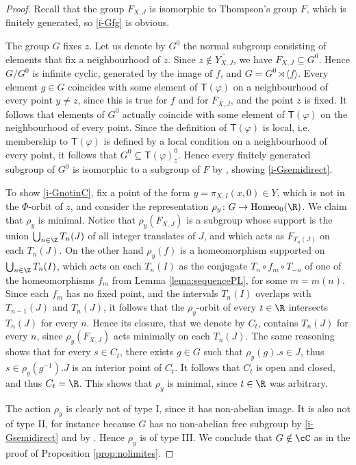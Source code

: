 \documentclass[reqno]{amsart}
\newcommand{\Tphi}{\mathsf{T}(\varphi)}
\begin{document}
\begin{proof}
Recall that the group $F_{X, J}$ is isomorphic to Thompson's group $F$, which is finitely generated, so \eqref{i-Gfg} is obvious. 

The group $G$ fixes $z$.  Let us denote by $G^0$ the normal subgroup consisting of elements that fix a neighbourhood of $z$.
Since $z\notin \overline{Y_{X,J}}$, we have $F_{X, J}\subseteq G^0$. Hence $G/G^0$ is infinite cyclic, generated by the image of $f$, and $G=G^0\rtimes \langle f\rangle$. Every element $g\in G$ coincides with some element of $\Tphi$ on a neighbourhood of every point $y\neq z$, since this  is true for $f$ and for  $F_{X, J}$, and the point $z$ is fixed. It follows that elements of $G^0$ actually coincide with some element of $\Tphi$ on the neighbourhood of every point. Since the definition of $\Tphi$ is local, i.e. membership to $\Tphi$ is defined by a local condition on a neighbourhood of every point,  it follows that $G^0\subseteq \Tphi^0_z$. Hence every finitely generated subgroup of $G^0$ is isomorphic to a subgroup of $F$ by \cite[Lemma 7.2]{MatteBonTriestino2020}, showing \eqref{i-Gsemidirect}.

To show \eqref{i-GnotinC}, fix a point of the form $y=\pi_{X, I}(x, 0)\in Y$, which is not in the $\Phi$-orbit of $z$, and consider the representation $\rho_y\colon G\to \mathrm{Homeo}_0(\R)$. We claim that $\rho_y$ is minimal. Notice that $\rho_y(F_{X, J})$ is a subgroup whose support is the union $\bigcup_{n\in \Z} T_n(J)$ of all integer translates of $J$, and which acts as $F_{T_n(J)}$ on each $T_n(J)$. On the other hand $\rho_y(f)$ is a homeomorphism supported on $\bigcup_{n\in \Z} T_n(I)$, which acts on each $T_n(I)$ as the conjugate $T_n \circ f_m \circ T_{-n}$ of one of the homeomorphisms $f_m$ from Lemma \ref{lema:sequencePL}, for some $m=m(n)$. Since each $f_m$ has no fixed point, and the intervals $T_n(I)$ overlaps with $T_{n-1}(J)$ and $T_n(J)$, it follows that the $\rho_y$-orbit of every $t\in \R$ intersects $T_n(J)$ for every $n$. Hence its closure, that we denote by $C_t$, contains $T_n(J)$ for every $n$, since $\rho_y(F_{X, J})$ acts minimally on each $T_n(J)$. The same reasoning shows that for every $s\in C_t$, there exists $g\in G$ such that $\rho_y(g).s\in J$, thus $s\in \rho_y(g^{-1}).J$ is an interior point of $C_t$. It follows that $C_t$ is open and closed, and thus $C_t=\R$.  This shows that $\rho_y$ is minimal, since $t\in \R$ was arbitrary.

The action $\rho_y$ is clearly not of type I, since it has non-abelian image. It is also not of type II, for instance because $G$ has no non-abelian free subgroup by \eqref{i-Gsemidirect} and by \cite{BrinSquier1985}. Hence $\rho_y$ is of type III. 
We conclude that $G\notin \cC$ as in the proof of Proposition \ref{prop:nolimites}. \qedhere












\end{proof}
\end{document}

